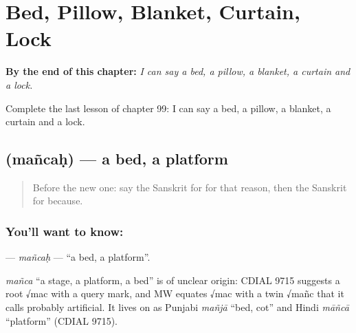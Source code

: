 
\chapter{Bed, Pillow, Blanket, Curtain, Lock}
\label{ch:sa-bed-pillow-blanket-curtain-lock}

\begin{chapteropening}
\textbf{By the end of this chapter:} \emph{I can say a bed, a pillow, a blanket, a curtain and a lock.}

Complete the last lesson of chapter 99: I can say a bed, a pillow, a blanket, a curtain and a lock.
\end{chapteropening}

\section[\texorpdfstring{\sk{मञ्चः} (mañcaḥ)}{मञ्चः (mañcaḥ)}]{ (mañcaḥ) — a bed, a platform}

\label{lesson:SA-C99-mancah}



\begin{quote}
Before the new one: say the Sanskrit for for that reason, then the Sanskrit for because.
\end{quote}

\subsection*{You'll want to know: }
\textbf{} — \emph{mañcaḥ} — \textquotedblleft{}a bed, a platform\textquotedblright{}.

\begin{cousinweb}
\emph{mañca} \textquotedblleft{}a stage, a platform, a bed\textquotedblright{} is of unclear origin: CDIAL 9715 suggests a root √mac with a query mark, and MW equates √mac with a twin √mañc that it calls probably artificial. It lives on as Punjabi \emph{mañjā} \textquotedblleft{}bed, cot\textquotedblright{} and Hindi \emph{māñcā} \textquotedblleft{}platform\textquotedblright{} (CDIAL 9715).
\end{cousinweb}

